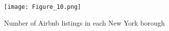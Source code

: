




\begin{figure}[h]\centering
    \caption{Number of Airbnb listings in each New York borough}
    \texttt{[image: Figure\_10.png]}
\end{figure}






